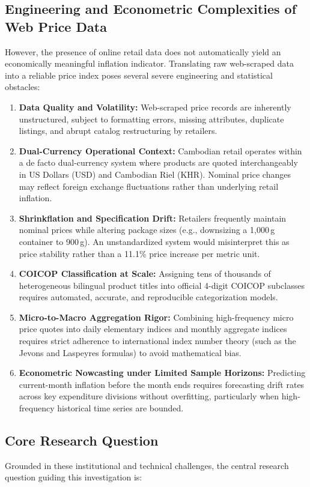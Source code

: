\subsection{Engineering and Econometric Complexities of Web Price Data}
\hs However, the presence of online retail data does not automatically yield an economically meaningful inflation indicator. Translating raw web-scraped data into a reliable price index poses several severe engineering and statistical obstacles:
\begin{enumerate}
    \item \textbf{Data Quality and Volatility:} Web-scraped price records are inherently unstructured, subject to formatting errors, missing attributes, duplicate listings, and abrupt catalog restructuring by retailers.
    \item \textbf{Dual-Currency Operational Context:} Cambodian retail operates within a de facto dual-currency system where products are quoted interchangeably in US Dollars (USD) and Cambodian Riel (KHR). Nominal price changes may reflect foreign exchange fluctuations rather than underlying retail inflation.
    \item \textbf{Shrinkflation and Specification Drift:} Retailers frequently maintain nominal prices while altering package sizes (e.g., downsizing a 1,000\,g container to 900\,g). An unstandardized system would misinterpret this as price stability rather than a 11.1\% price increase per metric unit.
    \item \textbf{COICOP Classification at Scale:} Assigning tens of thousands of heterogeneous bilingual product titles into official 4-digit COICOP subclasses requires automated, accurate, and reproducible categorization models.
    \item \textbf{Micro-to-Macro Aggregation Rigor:} Combining high-frequency micro price quotes into daily elementary indices and monthly aggregate indices requires strict adherence to international index number theory (such as the Jevons and Laspeyres formulas) to avoid mathematical bias.
    \item \textbf{Econometric Nowcasting under Limited Sample Horizons:} Predicting current-month inflation before the month ends requires forecasting drift rates across key expenditure divisions without overfitting, particularly when high-frequency historical time series are bounded.
\end{enumerate}

\subsection{Core Research Question}
\hs Grounded in these institutional and technical challenges, the central research question guiding this investigation is:

